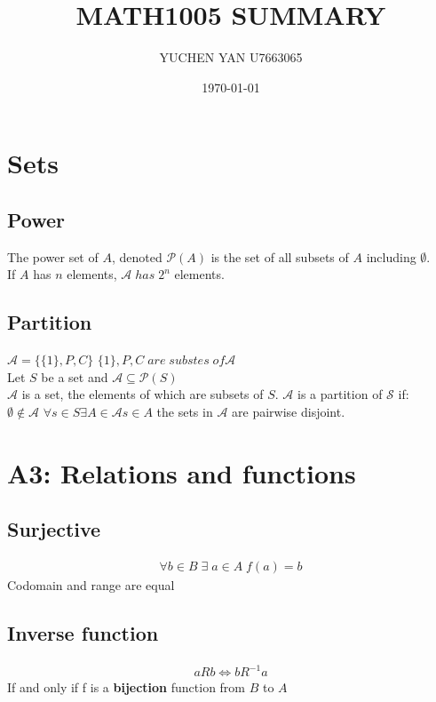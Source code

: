 \documentclass{article}
\title{MATH1005 SUMMARY}
\author{YUCHEN YAN U7663065}
\date{\today}
\begin{document}
\maketitle
\thispagestyle{empty}
\pagebreak
\begin{spacing}{1.5}
\section{Sets}
\subsection{Power}
The power set of $A$, denoted $\mathcal{P}(A)$ is the set of all 
subsets of $A$ including $\emptyset$. \\
If $A$  has $n$ elements, $\mathcal{A}\; has \;2^n$ elements.
\subsection{Partition}

$\mathcal{A} = \{\{1\},P,C\}$
$\{1\}, P, C \;are \;substes \;of \mathcal{A}$ \\
Let $S$ be a set and $\mathcal{A} \subseteq \mathcal{P} (S)$\\
$\mathcal{A} $ is a set, the elements of which are subsets of $S$.
$\mathcal{A}$ is a partition of $\mathcal{S}$ if:\\
$\emptyset \notin \mathcal{A}$
$\forall s \in S \exists A \in \mathcal{A} s \in A$
the sets in $\mathcal{A}$ are pairwise disjoint.

\section{A3: Relations and functions}
\subsection{Surjective}
\begin{align*}
     \forall  b \in B \; \exists \;a \in A \; f(a) = b 
\end{align*}
Codomain and range are equal 

\subsection{Inverse function}
\begin{align*}
    aRb \Leftrightarrow bR^{-1} a 
\end{align*}
If and only if f is a \textbf{bijection} function from $B$ to $A$

\end{spacing}
\end{document}
